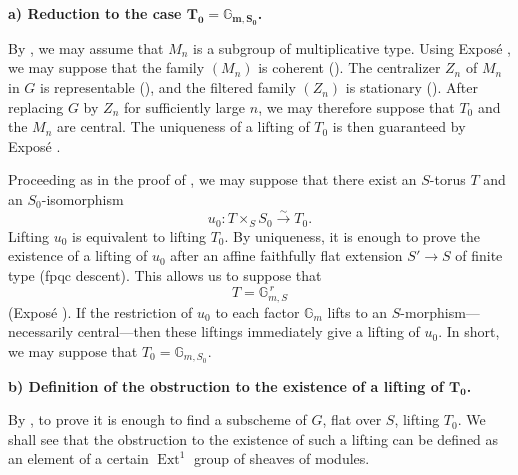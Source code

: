

\medskip\noindent\textbf{a) Reduction to the case
\(\boldsymbol{T_0=\mathbb G_{m,S_0}}\).}

By , we may assume that \(M_n\) is a subgroup of multiplicative
type. Using Exposé , we may suppose that the family
\((M_n)\) is coherent (). The centralizer \(Z_n\) of \(M_n\) in
\(G\) is representable (), and the filtered family \((Z_n)\) is
stationary (). After replacing \(G\) by \(Z_n\) for sufficiently
large \(n\), we may therefore suppose that \(T_0\) and the \(M_n\) are
central. The uniqueness of a lifting of \(T_0\) is then guaranteed
by Exposé .

Proceeding as in the proof of , we may suppose that there exist an
\(S\)-torus \(T\) and an \(S_0\)-isomorphism
\[
  u_0:T\times_S S_0\xrightarrow{\sim}T_0.
\]
Lifting \(u_0\) is equivalent to lifting \(T_0\). By uniqueness, it is
enough to prove the existence of a lifting of \(u_0\) after an affine
faithfully flat extension \(S'\to S\) of finite type (fpqc descent).
This allows us to suppose that
\[
  T=\mathbb G_{m,S}^{\,r}
\]
(Exposé ). If the restriction of \(u_0\) to each factor
\(\mathbb G_m\) lifts to an \(S\)-morphism---necessarily central---then
these liftings immediately give a lifting of \(u_0\). In short, we may
suppose that \(T_0=\mathbb G_{m,S_0}\).

\medskip\noindent\textbf{b) Definition of the obstruction to the
existence of a lifting of \(\boldsymbol{T_0}\).}

By , to prove  it is enough to find a subscheme of \(G\),
flat over \(S\), lifting \(T_0\). We shall see that the obstruction to
the existence of such a lifting can be defined as an element of a
certain \(\operatorname{Ext}^1\) group of sheaves of modules.

